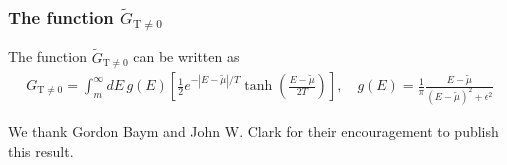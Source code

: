 \documentclass[sn-mathphys,Numbered]{sn-jnl}
\begin{document}
\subsubsection{The function $\tilde G_{\mathrm{T\neq0}}$}
The function $\tilde G_{\mathrm{T\neq0}}$ can be written as
\begin{align}
G_{\mathrm{T\neq0}}=\int^{\infty}_{m}dE\,g(E)\left[\frac{1}{2}e^{ - |E-\widetilde\mu|/T }\tanh\left(\frac{E-\widetilde\mu}{2T}\right)\right],\quad g(E)=\frac{1}{\pi} \frac{E-\tilde\mu}{(E-\tilde\mu)^2+\epsilon^2}
\end{align}

\backmatter

We thank Gordon Baym and John W. Clark for their encouragement to publish this result.


\end{document}
